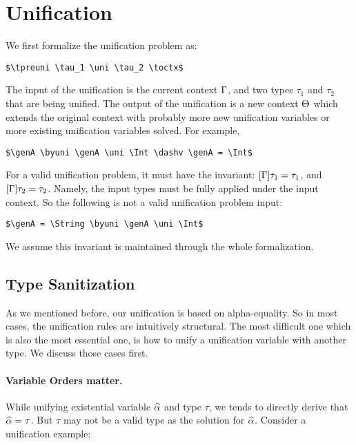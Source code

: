 \section{Unification}
\label{sec:unification}

We first formalize the unification problem as:

\begin{lstlisting}
$\tpreuni \tau_1 \uni \tau_2 \toctx$
\end{lstlisting}

The input of the unification is the current context $\Gamma$, and two types
$\tau_1$ and $\tau_2$ that are being unified. The output of the unification
is a new context $\Theta$ which extends the original context with probably more
new unification variables or more existing
unification variables solved. For example,

\begin{lstlisting}
$\genA \byuni \genA \uni \Int \dashv \genA = \Int$
\end{lstlisting}

For a valid unification problem, it must have the invariant: $[\Gamma] \tau_1 =
\tau_1$, and $[\Gamma] \tau_2 = \tau_2$. Namely, the input types must be
fully applied under the input context. So the following is not a valid
unification problem input:

\begin{lstlisting}
$\genA = \String \byuni \genA \uni \Int$
\end{lstlisting}

We assume this invariant is maintained through the whole
formalization.

\subsection{Type Sanitization}

As we mentioned before, our unification is based on alpha-equality. So in most
cases, the unification rules are intuitively structural. The most difficult
one which is also the most essential one, is how to unify a unification variable
with another type. We discuss those cases first.

\paragraph{Variable Orders matter.}

While unifying existential variable $\widehat{\alpha}$ and type $\tau$, we tends to
directly derive that $\widehat{\alpha} = \tau$. But $\tau$ may not be a valid type as the
solution for $\widehat{\alpha}$.
Consider a unification example:

